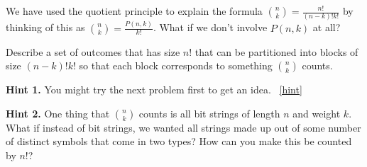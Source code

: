 \documentclass{book}
\begin{document}
\setcounter{project}{114}
\addtocounter{project}{-1}
\begin{activity}[]\label{activity-107}
\hypertarget{p-810}{}%
We have used the quotient principle to explain the formula \(\binom{n}{k} = \frac{n!}{(n-k)!k!}\) by thinking of this as \(\binom{n}{k} = \frac{P(n,k)}{k!}\).  What if we don't involve \(P(n,k)\) at all?%
\par
\hypertarget{p-811}{}%
Describe a set of outcomes that has size \(n!\) that can be partitioned into blocks of size \((n-k)!k!\) so that each block corresponds to something \(\binom{n}{k}\) counts.%
\par\smallskip%
\noindent\textbf{Hint 1.}\hypertarget{hint-70}{}\quad%
\hypertarget{p-812}{}%
You might try the next problem first to get an idea.%
~\hfill{\tiny\hyperlink{a-114}{[hint]}\hypertarget{q-114}{}}\par\smallskip%
\noindent\textbf{Hint 2.}\hypertarget{hint-71}{}\quad%
\hypertarget{p-813}{}%
One thing that \(\binom{n}{k}\) counts is all bit strings of length \(n\) and weight \(k\).  What if instead of bit strings, we wanted all strings made up out of some number of distinct symbols that come in two types?  How can you make this be counted by \(n!\)?%
\end{activity}
\end{document}
